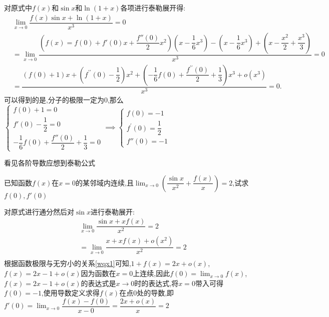 \documentclass[8pt a4paper, oneside, UTF8]{ctexbook}
\begin{document}
\begin{sloppypar}
\begin{problem}
    \end{problem}
    \begin{solution}
        对原式中$f(x)$和$\sin x$和$\ln(1+x)$各项进行泰勒展开得:
    \begin{equation*}
        \begin{split}    
            & \lim_{x\to 0}\dfrac{f(x)\sin x+\ln(1+x)}{x^3}=0 \\
            & = \lim_{x \to 0}\dfrac{(f(x)=f(0)+f'(0)x+\dfrac{f''(0)}{2}x^2)(x-\dfrac{1}{6}x^3)-(x-\dfrac{1}{6}x^3)+(x-\dfrac{x^2}{2}+\dfrac{x^3}{3})}{x^3}=0 \\
            & = \dfrac{(f(0)+1)x+(f^{\prime\prime}(0)-\dfrac{1}{2})x^{2}+(-\dfrac{1}{6}f(0)+\dfrac{f^{\prime\prime}(0)}{2}+\dfrac{1}{3})x^{3}+o(x^{3})}{x^{3}}=0.
    \end{split}
    \end{equation*}    
    可以得到的是,分子的极限一定为0,那么$\begin{cases}f(0)+1=0\\f'(0)-\dfrac{1}{2}=0\\-\dfrac{1}{6}f(0)+\dfrac{f''(0)}{2}+\dfrac{1}{3}=0\end{cases}\implies \begin{cases}f(0)=-1\\f^{\prime}(0)=\dfrac{1}{2}\\f''(0)=-1\end{cases}$
    \end{solution}
    \begin{note}
        看见各阶导数应想到泰勒公式
    \end{note}
    \begin{problem}
        已知函数$f(x)$在$x=0$的某邻域内连续,且$\lim_{x \to 0}(\dfrac{\sin x}{x^2}+\dfrac{f(x)}{x})=2$,试求$f(0),f'(0)$
    \end{problem}
    \begin{solution}
        对原式进行通分然后对$\sin x$进行泰勒展开:
        \begin{equation*}
            \begin{split}    
                & \lim_{x \to 0}\dfrac{\sin x+xf(x)}{x^2}=2\\
                & = \lim_{x \to 0}\dfrac{x+xf(x)+o(x^2)}{x^2}=2 \\
            \end{split}
        \end{equation*} 
    根据函数极限与无穷小的关系\ref{wqx1}可知,$1+f(x)=2x+o(x)$,$f(x)=2x-1+o(x)$因为函数在$x=0$上连续,因此$f(0)=\lim_{x\to 0}f(x)$,$f(x)=2x-1+o(x)$的表达式是$x\to 0$时的表达式,将$x=0$带入可得$f(0)=-1$,使用导数定义求得$f(x)$在点0处的导数,即$f'(0)=\lim_{x \to 0}\dfrac{f(x)-f(0)}{x-0}=\dfrac{2x+o(x)}{x}=2$

\end{solution}
\end{sloppypar}
\end{document}
